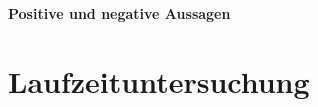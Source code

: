 \paragraph{Positive und negative Aussagen}


\section{Laufzeituntersuchung}%
\label{sec:evaluation:time}
